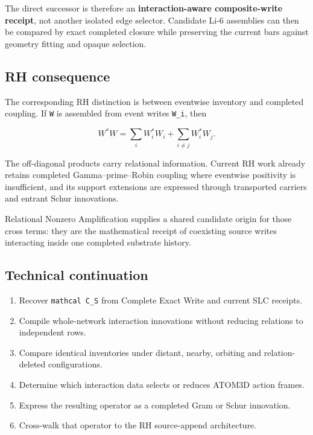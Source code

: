 The direct successor is therefore an \textbf{interaction-aware
composite-write receipt}, not another isolated edge selector. Candidate
Li-6 assemblies can then be compared by exact completed closure while
preserving the current bars against geometry fitting and opaque
selection.

\subsection{RH consequence}\label{viii-ch12-rh-consequence}

The corresponding RH distinction is between eventwise inventory and
completed coupling. If \texttt{W} is assembled from event writes
\texttt{W\_i}, then

\[
W^*W
=
\sum_i W_i^*W_i
+\sum_{i\ne j}W_i^*W_j.
\]

The off-diagonal products carry relational information. Current RH work
already retains completed Gamma--prime--Robin coupling where eventwise
positivity is insufficient, and its support extensions are expressed
through transported carriers and entrant Schur innovations.

Relational Nonzero Amplification supplies a shared candidate origin for
those cross terms: they are the mathematical receipt of coexisting
source writes interacting inside one completed substrate history.

\subsection{Technical continuation}\label{viii-ch12-technical-continuation-1}

\begin{enumerate}
\def\labelenumi{\arabic{enumi}.}
\tightlist
\item
  Recover \texttt{mathcal\ C\_S} from Complete Exact Write and current
  SLC receipts.
\item
  Compile whole-network interaction innovations without reducing
  relations to independent rows.
\item
  Compare identical inventories under distant, nearby, orbiting and
  relation-deleted configurations.
\item
  Determine which interaction data selects or reduces ATOM3D action
  frames.
\item
  Express the resulting operator as a completed Gram or Schur
  innovation.
\item
  Cross-walk that operator to the RH source-append architecture.
\end{enumerate}

